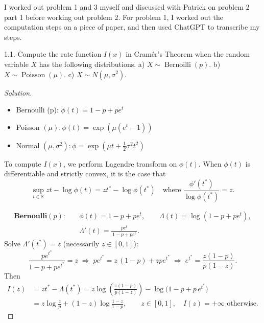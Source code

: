 
I worked out problem 1 and 3 myself and discussed with Patrick on problem 2 part 1 before working out problem 2. For problem 1, I worked out the computation steps on a piece of paper, and then used ChatGPT to transcribe my steps.

1.1. Compute the rate function $I(x)$ in Cramér's Theorem when the random variable $X$ has the following distributions.
a) $X \sim \operatorname{Bernoilli}(p)$.
b) $X \sim \operatorname{Poisson}(\mu)$.
c) $X \sim N\left(\mu, \sigma^2\right)$.

\begin{proof}[Solution]
	\begin{itemize}
		\item 
	Bernoulli (p): $\phi(t)=1-p+p e^t$
	\item
	Poisson $(\mu): \phi(t)=\exp \left(\mu\left(e^t-1\right)\right)$
	\item
	Normal $\left(\mu, \sigma^2\right): \phi=\exp \left(\mu t+\frac{1}{2} \sigma^2 t^2\right)$
	\end{itemize}
	To compute $I(x)$, we perform Lagendre transform on $\phi(t)$. When $\phi(t)$ is differentiable and strictly convex, it is the case that
	\[
		\sup_{t \in \mathbb{R}} zt - \log \phi(t) = zt^* - \log \phi(t^*) \quad \text{where } \frac{\phi'(t^*)}{\log \phi(t^*)} = z 
	.\]  

\[
\begin{aligned}
\textbf{Bernoulli}(p):\quad
&\phi(t) = 1-p + p e^t,\qquad \Lambda(t)=\log(1-p+pe^t),\\
&\Lambda'(t) = \frac{p e^t}{\,1-p+pe^t\,}.
\end{aligned}
\]
Solve \(\Lambda'(t^*)=z\) (necessarily \(z\in[0,1]\)):
\[
\frac{p e^{t^*}}{1-p+pe^{t^*}} = z
\;\Longrightarrow\;
p e^{t^*} = z\,(1-p) + z p e^{t^*}
\;\Longrightarrow\;
e^{t^*} = \frac{z(1-p)}{p(1-z)}.
\]
Then
\[
\begin{aligned}
I(z) &= z t^* - \Lambda(t^*)
= z \log\!\left(\frac{z(1-p)}{p(1-z)}\right) - \log\!\Big(1-p+p\,e^{t^*}\Big)\\
&= z \log\!\frac{z}{p} + (1-z)\log\!\frac{1-z}{1-p},
\qquad z\in[0,1],\quad I(z)=+\infty \text{ otherwise.}
\end{aligned}
\]


\end{proof}
